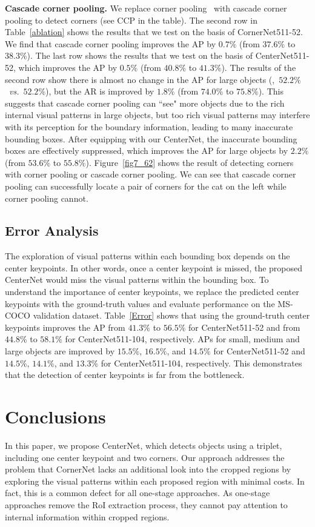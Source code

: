 \documentclass[10pt,twocolumn,letterpaper]{article}
\begin{document}
\vspace{1ex}\noindent\textbf{Cascade corner pooling.} We replace corner pooling~\cite{law2018cornernet} with cascade corner pooling to detect corners (see CCP in the table). The second row in Table~\ref{ablation} shows the results that we test on the basis of CornerNet511-52. We find that cascade corner pooling improves the AP by $0.7\%$ (from $37.6\%$ to $38.3\%$). The last row shows the results that we test on the basis of CenterNet511-52, which improves the AP by $0.5\%$ (from $40.8\%$ to $41.3\%$). The results of the second row show there is almost no change in the AP for large objects (\ie,~$52.2\%$~\emph{vs.}~$52.2\%$), but the AR is improved by $1.8\%$ (from $74.0\%$ to $75.8\%$). This suggests that cascade corner pooling can ``see" more objects due to the rich internal visual patterns in large objects, but too rich visual patterns may interfere with its perception for the boundary information, leading to many inaccurate bounding boxes. After equipping with our CenterNet, the inaccurate bounding boxes are effectively suppressed, which improves the AP for large objects by $2.2\%$ (from $53.6\%$ to $55.8\%$). Figure~\ref{fig7_62} shows the result of detecting corners with corner pooling or cascade corner pooling. We can see that cascade corner pooling can successfully locate a pair of corners for the cat on the left while corner pooling cannot.

\subsection{Error Analysis} The exploration of visual patterns within each bounding box depends on the center keypoints. In other words, once a center keypoint is missed, the proposed CenterNet would miss the visual patterns within the bounding box. To understand the importance of center keypoints, we replace the predicted center keypoints with the ground-truth values and evaluate performance on the MS-COCO validation dataset. Table~\ref{Error} shows that using the ground-truth center keypoints improves the AP from $41.3\%$ to $56.5\%$ for CenterNet511-52 and from $44.8\%$ to $58.1\%$ for CenterNet511-104, respectively. APs for small, medium and large objects are improved by $15.5\%$, $16.5\%$, and $14.5\%$ for CenterNet511-52 and $14.5\%$, $14.1\%$, and $13.3\%$ for CenterNet511-104, respectively. This demonstrates that the detection of center keypoints is far from the bottleneck.

\section{Conclusions}
\label{Conclusions}
In this paper, we propose CenterNet, which detects objects using a triplet, including one center keypoint and two corners. Our approach addresses the problem that CornerNet lacks an additional look into the cropped regions by exploring the visual patterns within each proposed region with minimal costs. In fact, this is a common defect for all one-stage approaches. As one-stage approaches remove the RoI extraction process, they cannot pay attention to internal information within cropped regions. 
\end{document}

